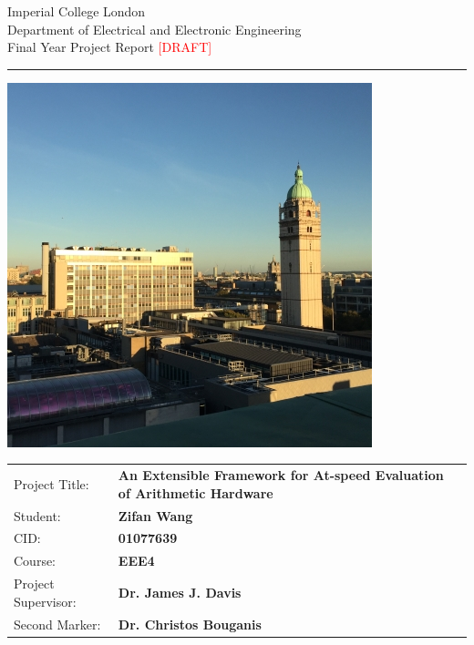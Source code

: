 \begin{titlepage}
  { \Large
    Imperial College London\\[17pt]
    Department of Electrical and Electronic Engineering\\[17pt]
    Final Year Project Report \textcolor{red}{[DRAFT]}
  }

  \rule{\columnwidth}{3pt}
  \vfill
  \centering
  \includegraphics[width=0.7\columnwidth]{img/1.jpg}
  \vfill

  \begin{table}[h]
  \def\arraystretch{1.8}
    \begin{tabular}{p{40mm}p{\dimexpr\columnwidth-40mm}}
      Project Title: & \textbf{An Extensible Framework for \newline At-speed Evaluation of Arithmetic Hardware} \\
      Student:       & \textbf{Zifan Wang} \\
      CID:           & \textbf{01077639} \\
      Course:        & \textbf{EEE4} \\
      Project Supervisor: & \textbf{Dr. James J. Davis} \\
      Second Marker: & \textbf{Dr. Christos Bouganis}
    \end{tabular}
  \end{table}
\end{titlepage}